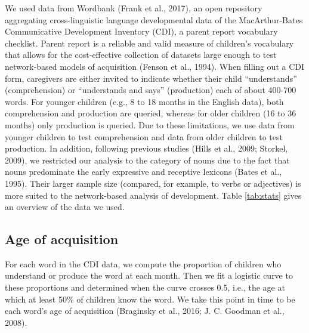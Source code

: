 \documentclass[english,floatsintext,man]{apa6}
\theoremstyle{definition}
\theoremstyle{definition}
\theoremstyle{definition}
\theoremstyle{remark}
\begin{document}
We used data from Wordbank (Frank et al., 2017), an open repository
aggregating cross-linguistic language developmental data of the
MacArthur-Bates Communicative Development Inventory (CDI), a parent
report vocabulary checklist. Parent report is a reliable and valid
measure of children's vocabulary that allows for the cost-effective
collection of datasets large enough to test network-based models of
acquisition (Fenson et al., 1994). When filling out a CDI form,
caregivers are either invited to indicate whether their child
\enquote{understands} (comprehension) or \enquote{understands and says}
(production) each of about 400-700 words. For younger children (e.g., 8
to 18 months in the English data), both comprehension and production are
queried, whereas for older children (16 to 36 months) only production is
queried. Due to these limitations, we use data from younger children to
test comprehension and data from older children to test production. In
addition, following previous studies (Hills et al., 2009; Storkel,
2009), we restricted our analysis to the category of nouns due to the
fact that nouns predominate the early expressive and receptive lexicons
(Bates et al., 1995). Their larger sample size (compared, for example,
to verbs or adjectives) is more suited to the network-based analysis of
development. Table \ref{tab:stats} gives an overview of the data we
used.

\subsection{Age of acquisition}\label{age-of-acquisition}

For each word in the CDI data, we compute the proportion of children who
understand or produce the word at each month. Then we fit a logistic
curve to these proportions and determined when the curve crosses 0.5,
i.e., the age at which at least 50\% of children know the word. We take
this point in time to be each word's age of acquisition (Braginsky et
al., 2016; J. C. Goodman et al., 2008).
\end{document}
